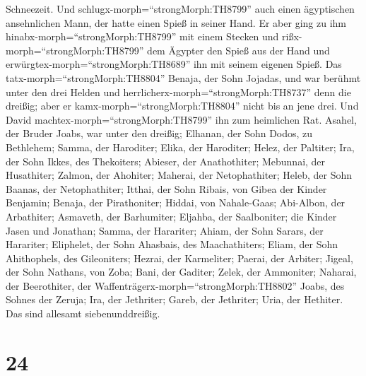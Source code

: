 Schneezeit.  Und schlugx-morph=``strongMorph:TH8799'' auch
einen ägyptischen ansehnlichen Mann, der hatte einen Spieß in seiner
Hand. Er aber ging zu ihm hinabx-morph=``strongMorph:TH8799'' mit einem
Stecken und rißx-morph=``strongMorph:TH8799'' dem Ägypter den Spieß aus
der Hand und erwürgtex-morph=``strongMorph:TH8689'' ihn mit seinem
eigenen Spieß.  Das tatx-morph=``strongMorph:TH8804''
Benaja, der Sohn Jojadas, und war berühmt unter den drei Helden
 und herrlicherx-morph=``strongMorph:TH8737'' denn die
dreißig; aber er kamx-morph=``strongMorph:TH8804'' nicht bis an jene
drei. Und David machtex-morph=``strongMorph:TH8799'' ihn zum heimlichen
Rat.  Asahel, der Bruder Joabs, war unter den dreißig;
Elhanan, der Sohn Dodos, zu Bethlehem;  Samma, der
Haroditer; Elika, der Haroditer;  Helez, der Paltiter; Ira,
der Sohn Ikkes, des Thekoiters;  Abieser, der Anathothiter;
Mebunnai, der Husathiter;  Zalmon, der Ahohiter; Maherai,
der Netophathiter;  Heleb, der Sohn Baanas, der
Netophathiter; Itthai, der Sohn Ribais, von Gibea der Kinder Benjamin;
 Benaja, der Pirathoniter; Hiddai, von Nahale-Gaas;
 Abi-Albon, der Arbathiter; Asmaveth, der Barhumiter;
 Eljahba, der Saalboniter; die Kinder Jasen und Jonathan;
 Samma, der Harariter; Ahiam, der Sohn Sarars, der
Harariter;  Eliphelet, der Sohn Ahasbais, des
Maachathiters; Eliam, der Sohn Ahithophels, des Gileoniters;
 Hezrai, der Karmeliter; Paerai, der Arbiter; 
Jigeal, der Sohn Nathans, von Zoba; Bani, der Gaditer; 
Zelek, der Ammoniter; Naharai, der Beerothiter, der
Waffenträgerx-morph=``strongMorph:TH8802'' Joabs, des Sohnes der Zeruja;
 Ira, der Jethriter; Gareb, der Jethriter; 
Uria, der Hethiter. Das sind allesamt siebenunddreißig.

\hypertarget{section-23}{%
\section{24}\label{section-23}}

